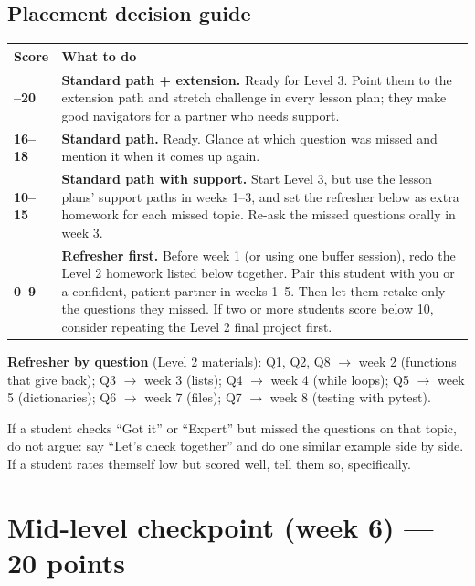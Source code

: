 \subsection{Placement decision guide}

\renewcommand{\arraystretch}{1.3}
\begin{longtable}{@{}>{\bfseries}p{2.2cm}p{\dimexpr\linewidth-2.2cm-2\tabcolsep}@{}}
\toprule
\rowcolor{kcaccent!15} Score & What to do\\ \midrule\endhead
\bottomrule\endfoot
19--20 & \textbf{Standard path + extension.} Ready for Level 3. Point them to the extension path and
stretch challenge in every lesson plan; they make good navigators for a partner who needs support.\\ \midrule
16--18 & \textbf{Standard path.} Ready. Glance at which question was missed and mention it when it
comes up again.\\ \midrule
10--15 & \textbf{Standard path with support.} Start Level 3, but use the lesson plans' support paths
in weeks 1--3, and set the refresher below as extra homework for each missed topic. Re-ask the
missed questions orally in week 3.\\ \midrule
0--9 & \textbf{Refresher first.} Before week 1 (or using one buffer session), redo the Level 2
homework listed below together. Pair this student with you or a confident, patient partner in
weeks 1--5. Then let them retake only the questions they missed.
If two or more students score below 10, consider repeating the Level 2 final project first.\\
\end{longtable}

\textbf{Refresher by question} (Level 2 materials):
Q1, Q2, Q8 $\rightarrow$ week 2 (functions that give back);
Q3 $\rightarrow$ week 3 (lists);
Q4 $\rightarrow$ week 4 (while loops);
Q5 $\rightarrow$ week 5 (dictionaries);
Q6 $\rightarrow$ week 7 (files);
Q7 $\rightarrow$ week 8 (testing with pytest).

\begin{tip}
If a student checks \enquote{Got it} or \enquote{Expert} but missed the questions on that topic, do
not argue: say \enquote{Let's check together} and do one similar example side by side. If a
student rates themself low but scored well, tell them so, specifically.
\end{tip}

\section{Mid-level checkpoint (week 6) --- 20 points}

